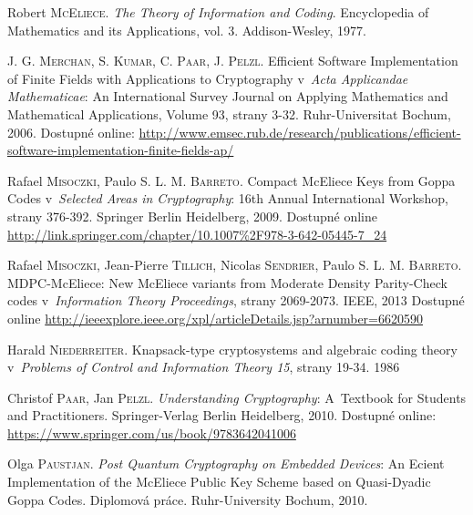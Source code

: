 \documentclass[thesis=M,czech,hidelinks]{FITthesis}[2012/06/26]
\newcommand{\0}{{\textcolor[gray]{0.75}{0}}}
\begin{document}
\begin{thebibliography}{99}
        Robert \textsc{McEliece}. \emph{The Theory of Information and Coding}.
        Encyclopedia of Mathematics and its Applications, vol. 3.
        Addison-Wesley, 1977.

        J. G. \textsc{Merchan}, S. \textsc{Kumar}, C. \textsc{Paar},
        J. \textsc{Pelzl}. Efficient Software Implementation of Finite
        Fields with Applications to Cryptography v~\emph{Acta Applicandae
        Mathematicae}: An International Survey Journal on Applying Mathematics
        and Mathematical Applications, Volume 93, strany  3-32.
        Ruhr-Universitat Bochum, 2006. Dostupné online:
        \url{http://www.emsec.rub.de/research/publications/efficient-software-implementation-finite-fields-ap/}

        Rafael \textsc{Misoczki}, Paulo S. L. M. \textsc{Barreto}. Compact
        McEliece Keys from Goppa Codes v~\emph{Selected Areas in Cryptography}:
        16th Annual International Workshop, strany 376-392. Springer Berlin
        Heidelberg, 2009. Dostupné online
        \url{http://link.springer.com/chapter/10.1007\%2F978-3-642-05445-7\_24}

        Rafael \textsc{Misoczki}, Jean-Pierre \textsc{Tillich}, Nicolas
        \textsc{Sendrier}, Paulo S. L. M. \textsc{Barreto}. MDPC-McEliece: New
        McEliece variants from Moderate Density Parity-Check codes
        v~\emph{Information Theory Proceedings}, strany 2069-2073. IEEE, 2013
        Dostupné online
        \url{http://ieeexplore.ieee.org/xpl/articleDetails.jsp?arnumber=6620590}

        Harald \textsc{Niederreiter}. Knapsack-type cryptosystems and
        algebraic coding theory v~\emph{Problems of Control and Information
        Theory 15}, strany 19-34. 1986

        Christof \textsc{Paar}, Jan \textsc{Pelzl}. \emph{Understanding
        Cryptography}: A~Textbook for Students and Practitioners.
        Springer-Verlag Berlin Heidelberg, 2010. Dostupné
        online: \url{https://www.springer.com/us/book/9783642041006}

        Olga \textsc{Paustjan}. \emph{Post Quantum Cryptography on Embedded
        Devices}: An Ecient Implementation of the McEliece Public Key Scheme
        based on Quasi-Dyadic Goppa Codes. Diplomová práce. Ruhr-University
        Bochum, 2010.


\end{thebibliography}
\end{document}

